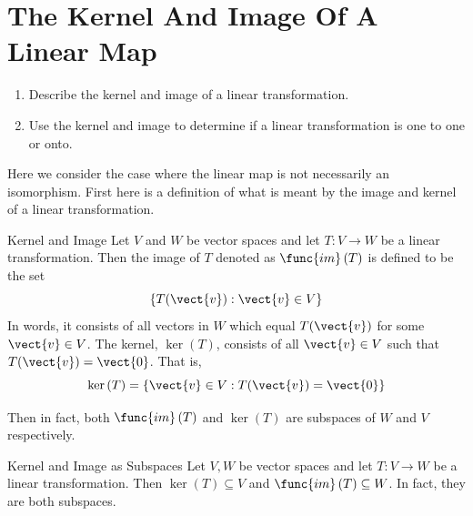 \section{The Kernel And Image Of A Linear Map}

\begin{outcome}
\begin{enumerate}
\item[A.] Describe the kernel and image of a linear transformation.

\item[B.] Use the kernel and image to determine if a linear transformation is one to one or onto. 
\end{enumerate}
\end{outcome}

Here we consider the case where the linear map is not necessarily an
isomorphism. First here is a definition of what is meant by the image and
kernel of a linear transformation.

\begin{definition}{Kernel and Image}
Let $V$ and $W$ be vector spaces and let $T:V\rightarrow W$ be a linear transformation. Then the image of $T$
denoted as $\func{im}\left( T\right) $ is defined to be the set 
\begin{equation*}
\left\{ T(\vect{v}):\vect{v}\in V\right\}
\end{equation*}
In words, it consists of all vectors in $W$ which equal $T(\vect{v})$ for some $
\vect{v}\in V$. The kernel, $\ker \left( T\right) $, 
consists of all $\vect{v}\in V$ such that $T(\vect{v})=\vect{0}$. That is, 
\begin{equation*}
\ker \left( T\right) =\left\{ \vect{v}\in V:T(\vect{v})=\vect{0}\right\}
\end{equation*}
\end{definition}

Then in fact, both $\func{im}\left( T\right) $ and $\ker \left( T\right) $
are subspaces of $W$ and $V$ respectively.

\begin{proposition}{Kernel and Image as Subspaces}\label{prop:kernelimagevectorspaces}
Let $V,W$ be vector spaces and let $T:V\rightarrow W$ be a linear transformation. Then $\ker \left(
T\right) \subseteq V$ and $\func{im}\left( T\right) \subseteq W$. In fact, they are both subspaces. 
\end{proposition}

